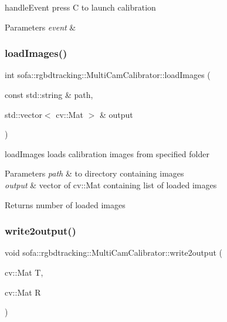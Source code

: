handle\+Event press C to launch calibration 


\begin{DoxyParams}{Parameters}
{\em event} & \\
\hline
\end{DoxyParams}
\mbox{\label{classsofa_1_1rgbdtracking_1_1_multi_cam_calibrator_a57189fd694afe501755e15c483fecd12}} 
\subsubsection{\texorpdfstring{load\+Images()}{loadImages()}}
{\footnotesize\ttfamily int sofa\+::rgbdtracking\+::\+Multi\+Cam\+Calibrator\+::load\+Images (\begin{DoxyParamCaption}\item[{const std\+::string \&}]{path,  }\item[{std\+::vector$<$ cv\+::\+Mat $>$ \&}]{output }\end{DoxyParamCaption})\hspace{0.3cm}{\ttfamily [inline]}}



load\+Images loads calibration images from specified folder 


\begin{DoxyParams}{Parameters}
{\em path} & to directory containing images \\
\hline
{\em output} & vector of cv\+::\+Mat containing list of loaded images \\
\hline
\end{DoxyParams}
\begin{DoxyReturn}{Returns}
number of loaded images 
\end{DoxyReturn}
\mbox{\label{classsofa_1_1rgbdtracking_1_1_multi_cam_calibrator_ae08d1a20d3ceb8e33a1d1a99365e1187}} 
\subsubsection{\texorpdfstring{write2output()}{write2output()}}
{\footnotesize\ttfamily void sofa\+::rgbdtracking\+::\+Multi\+Cam\+Calibrator\+::write2output (\begin{DoxyParamCaption}\item[{cv\+::\+Mat}]{T,  }\item[{cv\+::\+Mat}]{R }\end{DoxyParamCaption})\hspace{0.3cm}{\ttfamily [inline]}}



